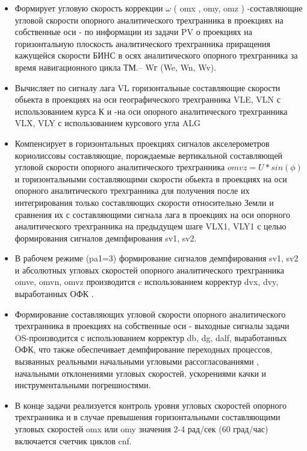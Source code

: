 \begin{itemize}
    \item Формирует угловую скорость коррекции $\omega$  ( omx ,  omy,  omz ) -составляющие   угловой скорости   опорного   аналитического   
    трехгранника в проекциях  на собственные оси  - 
    по информации из задачи  PV о проекциях на горизонтальную плоскость аналитического трехгранника  приращения  кажущейся скорости БИНС 
    в осях аналитического  опорного трехгранника  за время  навигационного  цикла  ТМ.-- Wг (We, Wn, Wv).  
    \item Вычисляет по сигналу лага  VL  горизонтальные  составляющие скорости   обьекта в  проекциях  на оси  географического трехгранника VLE, 
    VLN с использованием курса К и -на оси  опорного   аналитического   трехгранника  VLX,  VLY с использованием курсового  угла  ALG 
    \item Компенсирует в  горизонтальных проекциях сигналов акселерометров кориолиссовы составляющие,  порождаемые вертикальной составляющей угловой 
    скорости  опорного   аналитического   трехгранника $omvz=U*sin(\phi)$  и  горизонтальными  составляющими скорости   обьекта в проекциях  на 
    оси  опорного   аналитического   трехгранника  для получения после их интегрирования  только составляющих скорости относительно Земли и  
    сравнения их с составляющими  сигнала  лага  в проекциях  на оси  опорного   аналитического   трехгранника   на предыдущем  шаге  
    VLX1,  VLY1  с  целью  формирования сигналов демпфирования   sv1,   sv2.
    \item В рабочем режиме (pa1=3) формирование сигналов демпфирования  sv1, sv2 и  абсолютных угловых скоростей опорного  аналитического  трехгранника  
    omve,  omvn,   omvz  производится  c  использованием корректур  dvx,   dvy,  выработанных  ОФК .
    \item Формирование  составляющих угловой скорости опорного   аналитического  трехгранника в проекциях  на собственные оси - выходные сигналы 
    задачи   OS-производится  с использованием корректур  db,   dg,   dalf,   выработанных  ОФК, что также обеспечивает демпфирование переходных 
    процессов, вызванных реальными начальными угловыми рассогласованиями , начальными отклонениями угловых скоростей, 
    ускорениями качки и инструментальными погрешностями.
    \item В конце задачи реализуется   контроль  уровня  угловых скоростей опорного трехгранника  и в случае  превышения  горизонтальными составляющими 
    угловых скоростей omx  или  omy  значения 2-4  рад/сек  (60  град/час)  включается счетчик циклов  cnf.
\end{itemize}
